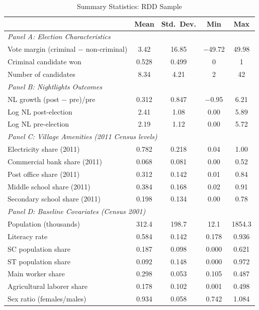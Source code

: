 \documentclass[12pt]{article}
\begin{document}
\begin{table}[H]
\centering
\caption{Summary Statistics: RDD Sample}
\label{tab:summary}
\begin{threeparttable}
\begin{tabular}{lcccc}
\toprule
 & Mean & Std.\ Dev. & Min & Max \\
\midrule
\multicolumn{5}{l}{\textit{Panel A: Election Characteristics}} \\[3pt]
Vote margin (criminal $-$ non-criminal) & 3.42 & 16.85 & $-$49.72 & 49.98 \\
Criminal candidate won & 0.528 & 0.499 & 0 & 1 \\
Number of candidates & 8.34 & 4.21 & 2 & 42 \\[6pt]
\multicolumn{5}{l}{\textit{Panel B: Nightlights Outcomes}} \\[3pt]
NL growth (post $-$ pre)/pre & 0.312 & 0.847 & $-$0.95 & 6.21 \\
Log NL post-election & 2.41 & 1.08 & 0.00 & 5.89 \\
Log NL pre-election & 2.19 & 1.12 & 0.00 & 5.72 \\[6pt]
\multicolumn{5}{l}{\textit{Panel C: Village Amenities (2011 Census levels)}} \\[3pt]
Electricity share (2011) & 0.782 & 0.218 & 0.04 & 1.00 \\
Commercial bank share (2011) & 0.068 & 0.081 & 0.00 & 0.52 \\
Post office share (2011) & 0.312 & 0.142 & 0.01 & 0.84 \\
Middle school share (2011) & 0.384 & 0.168 & 0.02 & 0.91 \\
Secondary school share (2011) & 0.198 & 0.134 & 0.00 & 0.78 \\[6pt]
\multicolumn{5}{l}{\textit{Panel D: Baseline Covariates (Census 2001)}} \\[3pt]
Population (thousands) & 312.4 & 198.7 & 12.1 & 1854.3 \\
Literacy rate & 0.584 & 0.142 & 0.178 & 0.936 \\
SC population share & 0.187 & 0.098 & 0.000 & 0.621 \\
ST population share & 0.092 & 0.148 & 0.000 & 0.972 \\
Main worker share & 0.298 & 0.053 & 0.105 & 0.487 \\
Agricultural laborer share & 0.178 & 0.102 & 0.001 & 0.498 \\
Sex ratio (females/males) & 0.934 & 0.058 & 0.742 & 1.084 \\
\bottomrule
\end{tabular}

\end{threeparttable}
\end{table}
\end{document}
